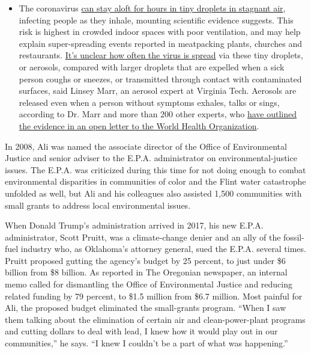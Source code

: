 \begin{itemize}
  \begin{itemize}
  \tightlist
  \item
    The coronavirus
    \href{https://www.nytimes3xbfgragh.onion/2020/07/04/health/239-experts-with-one-big-claim-the-coronavirus-is-airborne.html?action=click\&pgtype=Article\&state=default\&region=MAIN_CONTENT_3\&context=storylines_faq}{can
    stay aloft for hours in tiny droplets in stagnant air}, infecting
    people as they inhale, mounting scientific evidence suggests. This
    risk is highest in crowded indoor spaces with poor ventilation, and
    may help explain super-spreading events reported in meatpacking
    plants, churches and restaurants.
    \href{https://www.nytimes3xbfgragh.onion/2020/07/06/health/coronavirus-airborne-aerosols.html?action=click\&pgtype=Article\&state=default\&region=MAIN_CONTENT_3\&context=storylines_faq}{It's
    unclear how often the virus is spread} via these tiny droplets, or
    aerosols, compared with larger droplets that are expelled when a
    sick person coughs or sneezes, or transmitted through contact with
    contaminated surfaces, said Linsey Marr, an aerosol expert at
    Virginia Tech. Aerosols are released even when a person without
    symptoms exhales, talks or sings, according to Dr. Marr and more
    than 200 other experts, who
    \href{https://academic.oup.com/cid/article/doi/10.1093/cid/ciaa939/5867798}{have
    outlined the evidence in an open letter to the World Health
    Organization}.
  \end{itemize}
\end{itemize}

In 2008, Ali was named the associate director of the Office of
Environmental Justice and senior adviser to the E.P.A. administrator on
environmental-justice issues. The E.P.A. was criticized during this time
for not doing enough to combat environmental disparities in communities
of color and the Flint water catastrophe unfolded as well, but Ali and
his colleagues also assisted 1,500 communities with small grants to
address local environmental issues.

When Donald Trump's administration arrived in 2017, his new E.P.A.
administrator, Scott Pruitt, was a climate-change denier and an ally of
the fossil-fuel industry who, as Oklahoma's attorney general, sued the
E.P.A. several times. Pruitt proposed gutting the agency's budget by 25
percent, to just under \$6 billion from \$8 billion. As reported in The
Oregonian newspaper, an internal memo called for dismantling the Office
of Environmental Justice and reducing related funding by 79 percent, to
\$1.5 million from \$6.7 million. Most painful for Ali, the proposed
budget eliminated the small-grants program. ``When I saw them talking
about the elimination of certain air and clean-power-plant programs and
cutting dollars to deal with lead, I knew how it would play out in our
communities,'' he says. ``I knew I couldn't be a part of what was
happening.''


